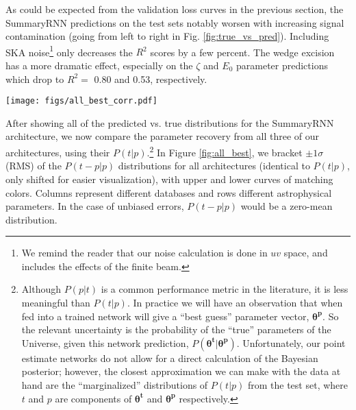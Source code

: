 \documentclass[fleqn,usenatbib]{mnras}
\begin{document}
As could be expected from the validation loss curves in the previous section, the SummaryRNN predictions on the test sets notably worsen with increasing signal contamination (going from left to right in Fig. \ref{fig:true_vs_pred}).  Including SKA noise\footnote{We remind the reader that our noise calculation is done in $uv$ space, and includes the effects of the finite beam.} only decreases the $R^2$ scores by a few percent.  The wedge excision has a more dramatic effect, especially on the $\zeta$ and $E_0$ parameter predictions which drop to $R^2=$ 0.80 and 0.53, respectively.  

\begin{figure*}
    \centering
    \texttt{[image: figs/all\_best\_corr.pdf]}
    \caption{Prediction errors for all architectures.  The lower and upper set of corresponding curves bracket $\pm1\sigma$ of the $P(t-p|p)$ distributions.  Columns represent different test databases, and rows different astrophysical parameters.}
    \label{fig:all_best}
\end{figure*}


After showing all of the predicted vs. true distributions for the SummaryRNN architecture, we now compare the parameter recovery from all three of our architectures, using their $P(t|p)$.\footnote{Although $P(p|t)$ is a common performance metric in the literature, it is less meaningful than $P(t|p)$.  In practice we will have an observation that when fed into a trained network will give a \enquote{best guess} parameter vector, $\boldsymbol{\theta^p}$.  So the relevant uncertainty is the probability of the \enquote{true} parameters of the Universe, given this network prediction, $P(\boldsymbol{\theta^t} | \boldsymbol{\theta^p})$.  Unfortunately, our point estimate networks do not allow for a direct calculation of the Bayesian posterior; however, the closest approximation we can make with the data at hand are the \enquote{marginalized} distributions of $P(t|p)$ from the test set, where $t$ and $p$ are components of $\boldsymbol{\theta^t}$ and $\boldsymbol{\theta^p}$ respectively.
}
In Figure \ref{fig:all_best}, we bracket $\pm 1 \sigma$ (RMS) of the $P(t-p|p)$ 
 distributions for all architectures (identical to $P(t|p)$, only shifted for easier visualization), with upper and lower curves of matching colors. Columns represent different databases and rows different astrophysical parameters. In the case of unbiased errors, $P(t-p|p)$ would be a zero-mean distribution.
\end{document}
